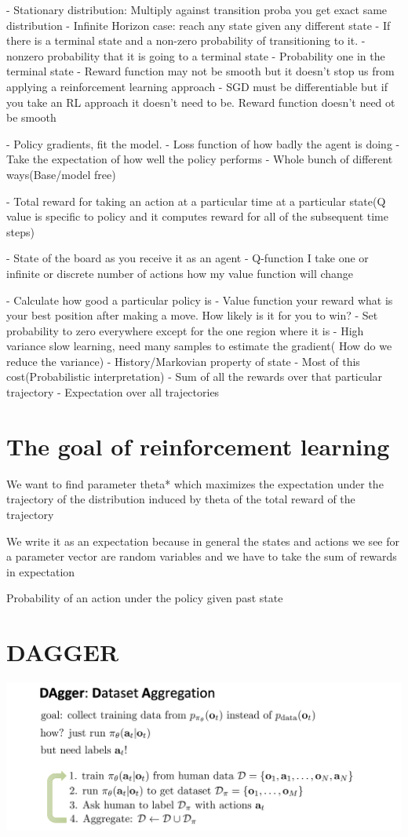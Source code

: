 \documentclass{article}
\begin{document}
- Stationary distribution: Multiply against transition proba you get exact same distribution
- Infinite Horizon case: reach any state given any different state
- If there is a terminal state and a non-zero probability of transitioning to it.
- nonzero probability that it is going to a terminal state
- Probability one in the terminal state
- Reward function may not be smooth but it doesn't stop us from applying a reinforcement learning approach
- SGD must be differentiable but if you take an RL approach it doesn't need to be. Reward function doesn't need ot be smooth

- Policy gradients, fit the model.
- Loss function of how badly the agent is doing
- Take the expectation of how well the policy performs
- Whole bunch of different ways(Base/model free)

- Total reward for taking an action at a particular time at a particular state(Q value is specific to policy and it computes reward for all of the subsequent time steps)


- State of the board as you receive it as an agent
- Q-function I take one or infinite or discrete number of actions how my value function will change

- Calculate how good a particular policy is
- Value function your reward what is your best position after making a move. How likely is it for you to win? 
- Set probability to zero everywhere except for the one region where it is 
- High variance slow learning, need many samples to estimate the gradient( How do we reduce the variance)
- History/Markovian property of state
- Most of this cost(Probabilistic interpretation)
- Sum of all the rewards over that particular trajectory
- Expectation over all trajectories

\section{The goal of reinforcement learning }
We want to find  parameter theta* which maximizes the expectation under the trajectory of the distribution induced by theta of the total reward of the trajectory

We write it as an expectation because in general the states and actions we see for a parameter vector are random variables and we have to take the sum of rewards in expectation

Probability of an action under the policy given past state

\section{DAGGER}
\includegraphics[scale=0.5]{dagger}
\end{document}
